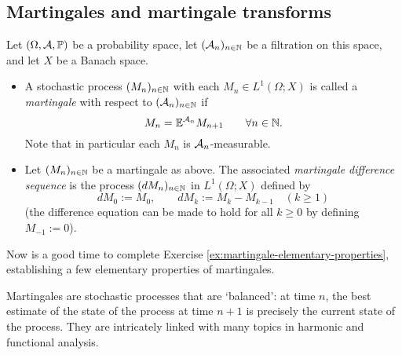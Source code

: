 \subsection{Martingales and martingale transforms}

\begin{defn}
  Let $(\Omega, \mathcal{A}, \mathbb{P})$ be a probability space, let $(\mathcal{A}_n)_{n \in \mathbb{N}}$ be a filtration on this space,  and let $X$ be a Banach space.
  \begin{itemize}
  \item
    A stochastic process $(M_n)_{n \in \mathbb{N}}$ with each $M_n \in L^1(\Omega; X)$ is called a \emph{martingale} with respect to $(\mathcal{A}_n)_{n \in \mathbb{N}}$ if 
    \begin{equation}\label{eq:mgale-defining-property}
      M_n = \mathbb{E}^{\mathcal{A}_n} M_{n+1} \qquad \forall n \in \mathbb{N}.
    \end{equation}
    Note that in particular each $M_n$ is $\mathcal{A}_n$-measurable.

  \item
    Let $(M_n)_{n \in \mathbb{N}}$ be a martingale as above.
    The associated \emph{martingale difference sequence} is the process $(dM_n)_{n \in \mathbb{N}}$ in $L^1(\Omega; X)$ defined by
    \begin{equation*}
      dM_0 := M_0, \qquad dM_k := M_k - M_{k-1} \quad (k \geq 1)
    \end{equation*}
    (the difference equation can be made to hold for all $k \geq 0$ by defining $M_{-1} := 0$).
  \end{itemize}
\end{defn}

\begin{rmk}
  Now is a good time to complete Exercise \ref{ex:martingale-elementary-properties}, establishing a few elementary properties of martingales. 
\end{rmk}

Martingales are stochastic processes that are `balanced': at time $n$, the best estimate of the state of the process at time $n+1$ is precisely the current state of the process.
They are intricately linked with many topics in harmonic and functional analysis.

